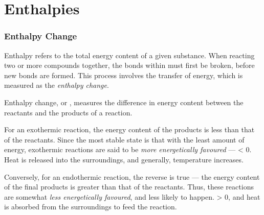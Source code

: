 
\pagebreak
\part{Enthalpies}

	\section{Enthalpy Change}

		Enthalpy refers to the total energy content of a given substance. When reacting two or more compounds together, the bonds within
		must first be broken, before new bonds are formed. This process involves the transfer of energy, which is measured as the
		\textit{enthalpy change}.

		Enthalpy change, or \enth{}, measures the difference in energy content between the reactants and the products of a reaction.

		For an exothermic reaction, the energy content of the products is less than that of the reactants. Since the most stable state
		is that with the least amount of energy, exothermic reactions are said to be \textit{more energetically favoured} --- \enth{} < 0.
		Heat is released into the surroundings, and generally, temperature increases.


		\pagebreak
		Conversely, for an endothermic reaction, the reverse is true --- the energy content of the final products is greater than that
		of the reactants. Thus, these reactions are somewhat \textit{less energetically favoured}, and less likely to happen.
		\enth{} > 0, and heat is absorbed from the surroundings to feed the reaction.


